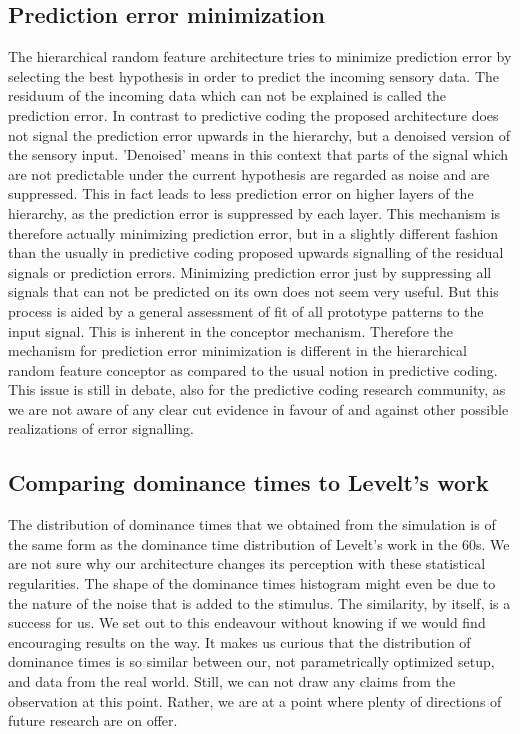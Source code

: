 \documentclass[utf8]{frontiersSCNS} %
\begin{document}
    \subsection{Prediction error minimization}
    The hierarchical random feature architecture tries to minimize prediction error by selecting the best hypothesis in order to 
    predict the incoming sensory data. The residuum of the incoming data which can not be explained is called the prediction error. 
    In contrast to predictive coding the proposed architecture does not signal the prediction error upwards in the hierarchy, 
    but a denoised version of the  sensory input. 'Denoised' means in this context that parts of the signal which are not predictable 
    under the current hypothesis are regarded as noise and are suppressed. This in fact leads to less prediction error on higher layers of the hierarchy, 
    as the prediction error is suppressed by each layer. This mechanism is therefore actually minimizing prediction error, 
    but in a slightly different fashion than the usually in predictive coding proposed upwards signalling of the residual signals or prediction errors. 
    Minimizing prediction error just by suppressing all signals that can not be predicted on its own does not seem very useful. 
    But this process is aided by a general assessment of fit of all prototype patterns to the input signal. This is inherent in the conceptor mechanism. 
    Therefore the mechanism for prediction error minimization is different in the hierarchical random feature conceptor as compared to the usual 
    notion in predictive coding. This issue is still in debate, also for the predictive coding research community, 
    as we are not aware of any clear cut evidence in favour of and against other possible realizations of error signalling. 
    
    
    \subsection{Comparing dominance times to Levelt's work}
    The distribution of dominance times that we obtained from the simulation is of the same form as the dominance time distribution of Levelt's work in the 60s. We are not sure why our architecture changes its perception with these statistical regularities. The shape of the dominance times histogram might even be due to the nature of the noise that is added to the stimulus.
    The similarity, by itself, is a success for us. We set out to this endeavour without knowing if we would find encouraging results on the way. It makes us curious that the distribution of dominance times is so similar between our, not parametrically optimized setup, and data from the real world. Still, we can not draw any claims from the observation at this point. Rather, we are at a point where plenty of directions of future research are on offer.
\end{document}
